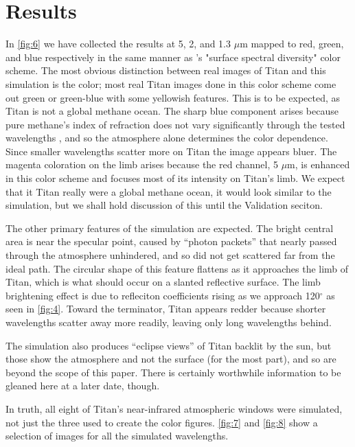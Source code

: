 \documentclass[twocolumn,linenumbers]{aastex631}
\begin{document}
\section{Results} \label{sec:results}

In \ref{fig:6} we have collected the results at 5, 2, and 1.3 $\mu$m mapped to red, green, and blue respectively in the same manner as \cite{Barnes2018}'s "surface spectral diversity" color scheme. The most obvious distinction between real images of Titan and this simulation is the color; most real Titan images done in this color scheme come out green or green-blue with some yellowish features. This is to be expected, as Titan is not a global methane ocean. The sharp blue component arises because pure methane's index of refraction does not vary significantly through the tested wavelengths \citep{Martonchik1994}, and so the atmosphere alone determines the color dependence. Since smaller wavelengths scatter more on Titan \citep{EsSayeh2023} the image appears bluer. The magenta coloration on the limb arises because the red channel, 5 $\mu$m, is enhanced in this color scheme and focuses most of its intensity on Titan's limb. We expect that it Titan really were a global methane ocean, it would look similar to the simulation, but we shall hold discussion of this until the Validation seciton.

The other primary features of the simulation are expected. The bright central area is near the specular point, caused by ``photon packets'' that nearly passed through the atmosphere unhindered, and so did not get scattered far from the ideal path. The circular shape of this feature flattens as it approaches the limb of Titan, which is what should occur on a slanted reflective surface. The limb brightening effect is due to refleciton coefficients rising as we approach 120$^{\circ}$ as seen in \ref{fig:4}. Toward the terminator, Titan appears redder because shorter wavelengths scatter away more readily, leaving only long wavelengths behind.

The simulation also produces ``eclipse views'' of Titan backlit by the sun, but those show the atmosphere and not the surface (for the most part), and so are beyond the scope of this paper. There is certainly worthwhile information to be gleaned here at a later date, though. 

In truth, all eight of Titan's near-infrared atmospheric windows were simulated, not just the three used to create the color figures. \ref{fig:7} and \ref{fig:8} show a selection of images for all the simulated wavelengths.
\end{document}
